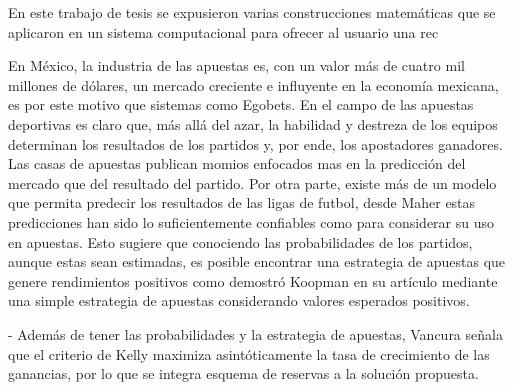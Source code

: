 %
%
%
%
%
%
%



En este trabajo de tesis se expusieron varias construcciones matemáticas que se aplicaron en un sistema computacional para ofrecer al usuario una rec

En México, la industria de las apuestas es, con un valor más de cuatro mil millones de dólares, un mercado creciente e influyente en la economía mexicana, es por este motivo que sistemas como Egobets. En el campo de las apuestas deportivas es claro que, más allá del azar, la habilidad y destreza de los equipos determinan los resultados de los partidos y, por ende, los apostadores ganadores. Las casas de apuestas publican momios enfocados mas en la predicción del mercado que del resultado del partido. Por otra parte, existe más de un modelo que permita predecir los resultados de las ligas de futbol, desde Maher \cite{maher1982modelling} estas predicciones han sido lo suficientemente confiables como para considerar su uso en apuestas. Esto sugiere que conociendo las probabilidades de los partidos, aunque estas sean estimadas, es posible encontrar una estrategia de apuestas que genere rendimientos positivos como demostró Koopman en su artículo \cite{koopman2013dynamic} mediante una simple estrategia de apuestas considerando valores esperados positivos.




- Además de tener las probabilidades y la estrategia de apuestas, Vancura \cite{vancura2000finding} señala que el criterio de Kelly \cite{kelly1956new} maximiza asintóticamente la tasa de crecimiento de las ganancias, por lo que se integra esquema de reservas a la solución propuesta.

